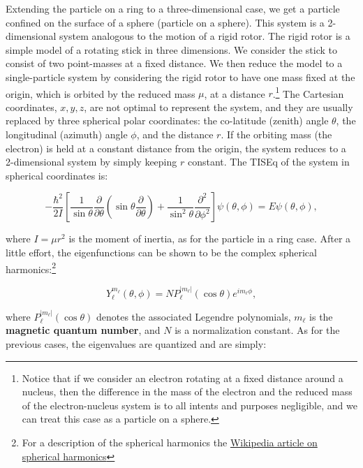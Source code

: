\documentclass[
  english,
  9pt,
]{extbook}
\theoremstyle{definition}
\theoremstyle{definition}
\theoremstyle{definition}
\theoremstyle{definition}
\theoremstyle{remark}
\begin{document}
Extending the particle on a ring to a three-dimensional case, we get a particle confined on the surface of a sphere (particle on a sphere). This system is a 2-dimensional system analogous to the motion of a rigid rotor. The rigid rotor is a simple model of a rotating stick in three dimensions. We consider the stick to consist of two point-masses at a fixed distance. We then reduce the model to a single-particle system by considering the rigid rotor to have one mass fixed at the origin, which is orbited by the reduced mass \(\mu\), at a distance \(r\).\footnote{Notice that if we consider an electron rotating at a fixed distance around a nucleus, then the difference in the mass of the electron and the reduced mass of the electron-nucleus system is to all intents and purposes negligible, and we can treat this case as a particle on a sphere.} The Cartesian coordinates, \({x,y,z}\), are not optimal to represent the system, and they are usually replaced by three spherical polar coordinates: the co-latitude (zenith) angle \(\theta\), the longitudinal (azimuth) angle \(\phi\), and the distance \(r\). If the orbiting mass (the electron) is held at a constant distance from the origin, the system reduces to a 2-dimensional system by simply keeping \(r\) constant. The TISEq of the system in spherical coordinates is:

\begin{equation}
- \frac{\hbar^2}{2I} \left[ \frac{1}{\sin \theta}
\frac{\partial}{\partial \theta} \left(\sin\theta\frac{\partial}{\partial \theta} \right) + \frac{1}{\sin^2 \theta} \frac{\partial^2}{\partial \phi^2} \right] \psi(\theta,\phi) = E \psi(\theta,\phi),
\label{eq:RR1}
\end{equation}

where \(I=\mu r^2\) is the moment of inertia, as for the particle in a ring case. After a little effort, the eigenfunctions can be shown to be the complex spherical harmonics:\footnote{For a description of the spherical harmonics the \href{https://en.wikipedia.org/wiki/Spherical_harmonic}{Wikipedia article on spherical harmonics}}

\begin{equation}
Y_{\ell}^{m_{\ell}}(\theta, \phi) = N P_{\ell}^{|m_\ell|}(\cos\theta) e^{im_\ell\phi},
\label{eq:RR1b}
\end{equation}

where \(P_{\ell}^{|m_\ell|}(\cos\theta)\) denotes the associated Legendre polynomials, \(m_\ell\) is the \textbf{magnetic quantum number}, and \(N\) is a normalization constant. As for the previous cases, the eigenvalues are quantized and are simply:
\end{document}
